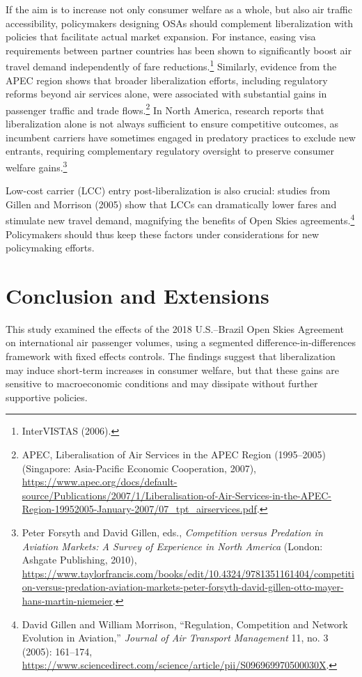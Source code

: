 \documentclass[12pt]{article}
\begin{document}
If the aim is to increase not only consumer welfare as a whole, but also air traffic accessibility, policymakers designing OSAs should complement liberalization with policies that facilitate actual market expansion. For instance, easing visa requirements between partner countries has been shown to significantly boost air travel demand independently of fare reductions.\footnote{InterVISTAS (2006).} Similarly, evidence from the APEC region shows that broader liberalization efforts, including regulatory reforms beyond air services alone, were associated with substantial gains in passenger traffic and trade flows.\footnote{APEC, Liberalisation of Air Services in the APEC Region (1995–2005) (Singapore: Asia-Pacific Economic Cooperation, 2007), \url{https://www.apec.org/docs/default-source/Publications/2007/1/Liberalisation-of-Air-Services-in-the-APEC-Region-19952005-January-2007/07_tpt_airservices.pdf}.} In North America, research reports that liberalization alone is not always sufficient to ensure competitive outcomes, as incumbent carriers have sometimes engaged in predatory practices to exclude new entrants, requiring complementary regulatory oversight to preserve consumer welfare gains.\footnote{Peter Forsyth and David Gillen, eds., \textit{Competition versus Predation in Aviation Markets: A Survey of Experience in North America} (London: Ashgate Publishing, 2010), \url{https://www.taylorfrancis.com/books/edit/10.4324/9781351161404/competition-versus-predation-aviation-markets-peter-forsyth-david-gillen-otto-mayer-hans-martin-niemeier}.}

Low-cost carrier (LCC) entry post-liberalization is also crucial: studies from Gillen and Morrison (2005) show that LCCs can dramatically lower fares and stimulate new travel demand, magnifying the benefits of Open Skies agreements.\footnote{David Gillen and William Morrison, “Regulation, Competition and Network Evolution in Aviation,” \textit{Journal of Air Transport Management} 11, no. 3 (2005): 161–174, \url{https://www.sciencedirect.com/science/article/pii/S096969970500030X}.} Policymakers should thus keep these factors under considerations for new policymaking efforts.

\section{Conclusion and Extensions}

This study examined the effects of the 2018 U.S.–Brazil Open Skies Agreement on international air passenger volumes, using a segmented difference-in-differences framework with fixed effects controls. The findings suggest that liberalization may induce short-term increases in consumer welfare, but that these gains are sensitive to macroeconomic conditions and may dissipate without further supportive policies.
\end{document}
